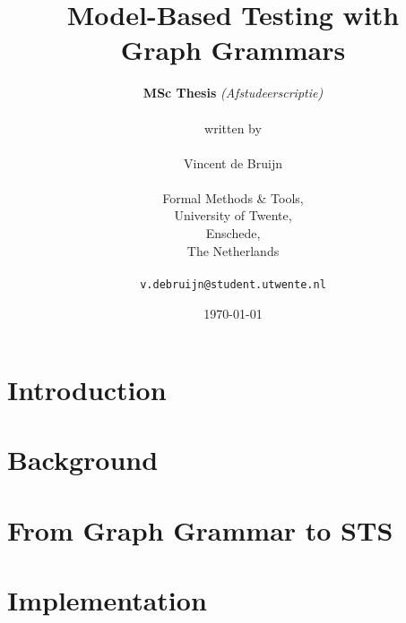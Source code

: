 \documentclass[a4paper]{report}
\theoremstyle{definition}
\begin{document}
  \title{\textbf{Model-Based Testing with\\Graph Grammars}}
  \author{\textbf{MSc Thesis} \textit{(Afstudeerscriptie)}\\
  \\
  written by
  \\
  \\
  Vincent de Bruijn\\
  \\
  Formal Methods \& Tools,\\
  University of Twente,
  \\Enschede,\\
  The Netherlands\\
  \\
  \texttt{v.debruijn@student.utwente.nl}}
  \date{\today}
  \maketitle
  
  
  
  \newpage
  \tableofcontents
  \newpage

  \newpage
  \chapter{Introduction}\label{chapter:introduction}
  
  
  
  \newpage
  \chapter{Background}\label{chapter:background}
  
  
  
  
  
  
  

  \newpage
  \chapter{From Graph Grammar to STS}\label{chapter:gg_to_sts}
  
  
  
  \newpage
  \chapter{Implementation}\label{chapter:implementation}
  
\end{document}
